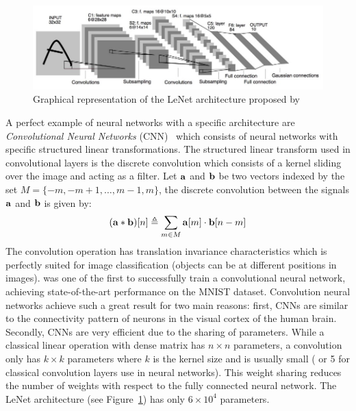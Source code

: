 \begin{figure}[htb]
  \centering
  \includegraphics[scale=0.4]{figures/chapter1/lenet.jpg}
  \caption{Graphical representation of the LeNet architecture proposed by \citet{lecun1998gradient}}
  \label{figure:lenet_network}
\end{figure}

A perfect example of neural networks with a specific architecture are \emph{Convolutional Neural Networks} (CNN)~\cite{lecun1998gradient,krizhevsky2012imagenet,He_2016_CVPR,tan2019efficientnet} which consists of neural networks with specific structured linear transformations. 
The structured linear transform used in convolutional layers is the discrete convolution which consists of a kernel sliding over the image and acting as a filter.
Let $\mathbf{a}$ and $\mathbf{b}$ be two vectors indexed by the set $M = \{-m, -m+1, \dots, m-1, m\}$, the discrete convolution between the signals $\mathbf{a}$ and $\mathbf{b}$ is given by: 
\begin{equation}
  (\avec \ast \bvec) \left[ n \right] \triangleq \sum_{m \in M} \avec\left[m\right] \cdot \bvec\left[n - m\right]
\end{equation}
The convolution operation has translation invariance characteristics \cite{zhang1990parallel} which is perfectly suited for image classification (objects can be at different positions in images).  
\citet{lecun1998gradient} was one of the first to successfully train a convolutional neural network, achieving state-of-the-art performance on the MNIST dataset.
Convolution neural networks achieve such a great result for two main reasons:
first, CNNs are similar to the connectivity pattern of neurons in the visual cortex of the human brain. 
Secondly, CNNs are very efficient due to the sharing of parameters. 
While a classical linear operation with dense matrix has $n \times n$ parameters, a convolution only has $k \times k$ parameters where $k$ is the kernel size and is usually small ( or 5 for classical convolution layers use in neural networks).
This weight sharing reduces the number of weights with respect to the fully connected neural network. The LeNet architecture (see Figure~\ref{figure:lenet_network}) has only $6 \times 10^4$ parameters.  


